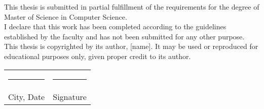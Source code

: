 This thesis is submitted in partial fulfillment of the requirements for the degree of Master of Science in Computer Science.\\

\noindent I declare that this work has been completed according to the guidelines established by the faculty and has not been submitted for any other purpose.\\

\noindent This thesis is copyrighted by its author, [name]. It may be used or reproduced for educational purposes only, given proper credit to its author.\\


\vspace{2cm}

\begin{tabular}{p{}p{}}
    \hrule width6cm     & \hrule width6cm    \\
    {\small City, Date} & {\small Signature} \\
\end{tabular}